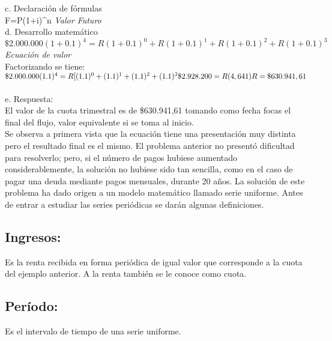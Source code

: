 c. Declaración de fórmulas\\

		F=P(1+i)^{n} \hspace{35} \textit{Valor Futuro} \\


d. Desarrollo matemático \\

	$	\$2.000.000(1+ 0.1)^{4}=R(1+ 0.1)^{0}+R(1+ 0.1)^{1}+R(1+ 0.1)^{2 }+R(1+ 0.1)^{3}$ \hspace{8} \textit{Ecuación de valor}\\


Factorizando se tiene:\\

	$	\$2.000.000(1.1)^{4}=R[(1.1)^{0}+(1.1)^{1}+(1.1)^{2 }+(1.1)^{3} 
		\\
		\$2.928.200=R(4,641)
		\\
		R=\$630.941,61\\$
		\\
		\\
e. Respuesta: \\

El valor de la cuota trimestral es de \$630.941,61 tomando como fecha focas el final del flujo, valor equivalente si se toma al inicio.
\\

Se observa a primera vista que la ecuación tiene una presentación muy distinta pero el resultado final es el mismo. El problema anterior no presentó dificultad para resolverlo; pero, si el número de pagos hubiese aumentado considerablemente, la solución no hubiese sido tan sencilla, como en el caso de pagar una deuda mediante pagos mensuales, durante 20 años. 
La solución de este problema ha dado origen a un modelo matemático llamado serie uniforme. Antes de entrar a estudiar las series periódicas se darán algunas definiciones.

\subsection{Ingresos:}Es la renta recibida en forma periódica de igual valor que corresponde a la cuota del ejemplo anterior. A la renta también se le conoce como cuota.

\subsection{Período:}
Es el intervalo de tiempo de una serie uniforme.

